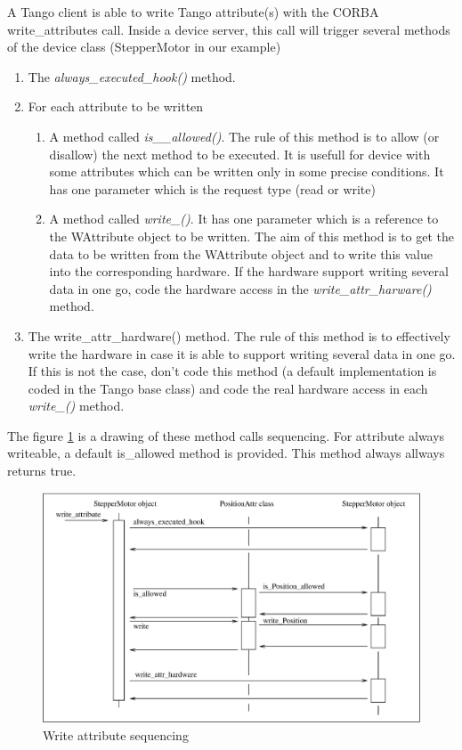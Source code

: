 A Tango client is able to write Tango attribute(s) with the CORBA
write\_attributes call. Inside a device server,
this call will trigger several methods of the device class (StepperMotor
in our example)
\begin{enumerate}
\item The \emph{always\_executed\_hook()}
method. 
\item For each attribute to be written

\begin{enumerate}
\item A method called \emph{is\_<att name>\_allowed()}. The rule of this
method is to allow (or disallow) the next method to be executed. It
is usefull for device with some attributes which can be written only
in some precise conditions. It has one parameter which is the request
type (read or write)
\item A method called \emph{write\_<att name>()}. It has one parameter which
is a reference to the WAttribute object to be written. The aim of
this method is to get the data to be written from the WAttribute object
and to write this value into the corresponding hardware. If the hardware
support writing several data in one go, code the hardware access in
the \emph{write\_attr\_harware()} method.
\end{enumerate}
\item The write\_attr\_hardware() method. The
rule of this method is to effectively write the hardware in case it
is able to support writing several data in one go. If this is not
the case, don't code this method (a default implementation is coded
in the Tango base class) and code the real hardware access in each
\emph{write\_<att name>()} method.
\end{enumerate}
The figure \ref{w_attribute_timing_fig} is a drawing of these method
calls sequencing. For attribute always writeable, a default is\_allowed
method is provided. This method always allways returns true.
\begin{figure}[H]
\begin{centering}
\includegraphics[scale=0.7]{ds_writing/w_attribute}
\par\end{centering}
\caption{Write attribute sequencing\label{w_attribute_timing_fig}}
\end{figure}


